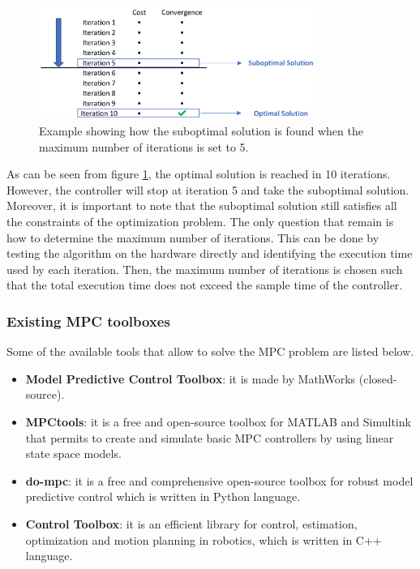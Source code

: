 \documentclass{thesisreport}
\begin{document}
\begin{figure}[h]
\centering
\includegraphics[width=0.8\textwidth]{Images/Control/Suboptimal_Solution.png}
\caption{Example showing how the suboptimal solution is found when the maximum number of iterations is set to 5.}
\label{Suboptimal_solution_example}
\end{figure}

\noindent As can be seen from figure \ref{Suboptimal_solution_example}, the optimal solution is reached in 10 iterations. However, the controller will stop at iteration 5 and take the suboptimal solution. Moreover, it is important to note that the suboptimal solution still satisfies all the constraints of the optimization problem. The only question that remain is how to determine the maximum number of iterations. This can be done by testing the algorithm on the hardware directly and identifying the execution time used by each iteration. Then, the maximum number of iterations is chosen such that the total execution time does not exceed the sample time of the controller.


  \subsubsection{Existing MPC toolboxes} Some of the available tools that allow to solve the MPC problem are listed below.
  
  \begin{itemize}
  	\item \textbf{Model Predictive Control Toolbox}\footnotemark : it is made by MathWorks (closed-source).
  	\item \textbf{MPCtools}\footnotemark : it is a free and open-source toolbox for MATLAB and Simultink that  permits to create and simulate basic MPC controllers by using linear state space models.
  	\item \textbf{do-mpc}\footnotemark : it is a free and comprehensive open-source toolbox for robust model predictive control which is written in Python language.
  	\item \textbf{Control Toolbox}\footnotemark : it is an efficient library for control, estimation, optimization and motion planning in robotics, which is written in C++ language.
  \end{itemize}
  
\end{document}
